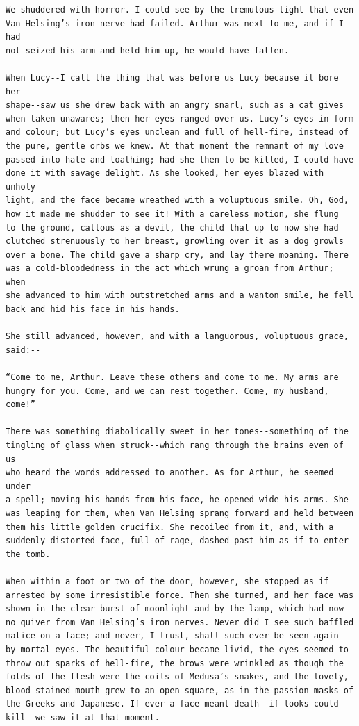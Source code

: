 \documentclass{article}
\begin{document}
\begin{verbatim}
We shuddered with horror. I could see by the tremulous light that even
Van Helsing’s iron nerve had failed. Arthur was next to me, and if I had
not seized his arm and held him up, he would have fallen.

When Lucy--I call the thing that was before us Lucy because it bore her
shape--saw us she drew back with an angry snarl, such as a cat gives
when taken unawares; then her eyes ranged over us. Lucy’s eyes in form
and colour; but Lucy’s eyes unclean and full of hell-fire, instead of
the pure, gentle orbs we knew. At that moment the remnant of my love
passed into hate and loathing; had she then to be killed, I could have
done it with savage delight. As she looked, her eyes blazed with unholy
light, and the face became wreathed with a voluptuous smile. Oh, God,
how it made me shudder to see it! With a careless motion, she flung
to the ground, callous as a devil, the child that up to now she had
clutched strenuously to her breast, growling over it as a dog growls
over a bone. The child gave a sharp cry, and lay there moaning. There
was a cold-bloodedness in the act which wrung a groan from Arthur; when
she advanced to him with outstretched arms and a wanton smile, he fell
back and hid his face in his hands.

She still advanced, however, and with a languorous, voluptuous grace,
said:--

“Come to me, Arthur. Leave these others and come to me. My arms are
hungry for you. Come, and we can rest together. Come, my husband, come!”

There was something diabolically sweet in her tones--something of the
tingling of glass when struck--which rang through the brains even of us
who heard the words addressed to another. As for Arthur, he seemed under
a spell; moving his hands from his face, he opened wide his arms. She
was leaping for them, when Van Helsing sprang forward and held between
them his little golden crucifix. She recoiled from it, and, with a
suddenly distorted face, full of rage, dashed past him as if to enter
the tomb.

When within a foot or two of the door, however, she stopped as if
arrested by some irresistible force. Then she turned, and her face was
shown in the clear burst of moonlight and by the lamp, which had now
no quiver from Van Helsing’s iron nerves. Never did I see such baffled
malice on a face; and never, I trust, shall such ever be seen again
by mortal eyes. The beautiful colour became livid, the eyes seemed to
throw out sparks of hell-fire, the brows were wrinkled as though the
folds of the flesh were the coils of Medusa’s snakes, and the lovely,
blood-stained mouth grew to an open square, as in the passion masks of
the Greeks and Japanese. If ever a face meant death--if looks could
kill--we saw it at that moment.


\end{verbatim}
\end{document}
